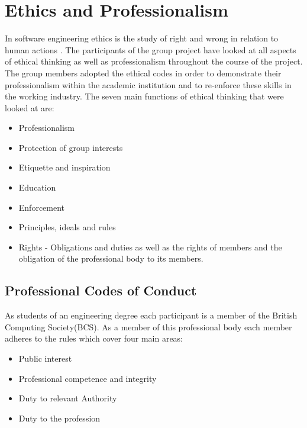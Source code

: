 \section{Ethics and Professionalism} 
\label{sec:ethics_and_professionalism}

In software engineering ethics is the study of right and wrong in relation to human actions \citep{profissues01}. The participants of the group project have looked at all aspects of ethical thinking as well as professionalism throughout the course of the project. The group members adopted the ethical codes in order to demonstrate their professionalism within the academic institution and to re-enforce these skills in the working industry. The seven main functions of ethical thinking that were looked at are:

\begin{itemize}
	\item Professionalism
	\item Protection of group interests
	\item Etiquette and inspiration
	\item Education
	\item Enforcement
	\item Principles, ideals and rules
	\item Rights - Obligations and duties as well as the rights of members and the obligation of the professional body to its members. 
\end{itemize}


\subsection{Professional Codes of Conduct}

As students of an engineering degree each participant is a member of the British Computing Society(BCS). As a member of this professional body each member adheres to the rules which cover four main areas:

\begin{itemize}
	\item Public interest
	\item Professional competence and integrity
	\item Duty to relevant Authority
	\item Duty to the profession
\end{itemize}

\hfill{\citet{bcs14}}

